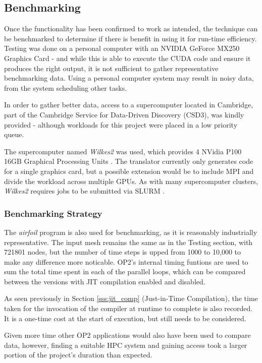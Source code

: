 \subsection{Benchmarking}
Once the functionality has been confirmed to work as intended, the technique can be benchmarked to determine if there is benefit in using it for run-time efficiency. Testing was done on a personal computer with an NVIDIA GeForce MX250 Graphics Card \cite{mx250} - and while this is able to execute the CUDA code and ensure it produces the right output, it is not sufficient to gather representative benchmarking data. Using a personal computer system may result in noisy data, from the system scheduling other tasks.
\par
In order to gather better data, access to a supercomputer located in Cambridge, part of the Cambridge Service for Data-Driven Discovery (CSD3), was kindly provided - although workloads for this project were placed in a low priority queue.
\par
The supercomputer named \textit{Wilkes2} was used, which provides 4 NVidia P100 16GB Graphical Processing Units \cite{p100}. The translator currently only generates code for a single graphics card, but a possible extension would be to include MPI and divide the workload across multiple GPUs. As with many supercomputer clusters, \textit{Wilkes2} requires jobs to be submitted via SLURM \cite{slurm}.

\subsubsection{Benchmarking Strategy}
The \textit{airfoil} program is also used for benchmarking, as it is reasonably industrially representative. The input mesh remains the same as in the Testing section, with 721801 nodes, but the number of time steps is upped from 1000 to 10,000 to make any difference more noticable. OP2's internal timing funtions are used to sum the total time spent in each of the parallel loops, which can be compared between the versions with JIT compilation enabled and disabled.
\par
As seen previously in Section \ref{sss:jit_comp} (Just-in-Time Compilation), the time taken for the invocation of the compiler at runtime to complete is also recorded. It is a one-time cost at the start of execution, but still needs to be considered.
\par
Given more time other OP2 applications would also have been used to compare data, however, finding a suitable HPC system and gaining access took a larger portion of the project's duration than expected.

